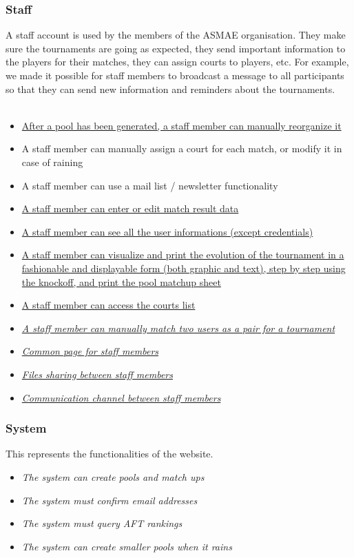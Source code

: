 \documentclass[a4paper, 12pt]{article}
\begin{document}
\subsubsection*{Staff} 
    A staff account is used by the members of the ASMAE organisation. They make sure the tournaments are going as expected, they send important information to the players for their matches, they can assign courts to players, etc. For example, we made it possible for staff members to  broadcast a message to all participants so that they can send new information and reminders about the tournaments.\\\\
    
    \begin{itemize}
    	\item \underline{After a pool has been generated, a staff member can manually reorganize it}
		\item A staff member can manually assign a court for each match, or modify it in case of raining
		\item A staff member can use a mail list / newsletter functionality
		\item \underline{A staff member can enter or edit match result data}
		\item \underline{A staff member can see all the user informations (except credentials)}
		\item \underline{A staff member can visualize and print the evolution of the tournament in a fashionable and displayable form (both graphic and text), step by step using the knockoff, and print the pool matchup sheet}
		\item \underline{A staff member can access the courts list}
		\item \underline{\textit{A staff member can manually match two users as a pair for a tournament}}
		\item \underline{\textit{Common page for staff members}}
		\item \underline{\textit{Files sharing between staff members}}
		\item \underline{\textit{Communication channel between staff members}}
    \end{itemize}
    
\subsubsection*{System}   
     This represents the functionalities of the website.
    \begin{itemize}
    	\item \textit{The system can create pools and match ups}
		\item \textit{The system must confirm email addresses}
		\item \textit{The system must query AFT rankings}
		\item \textit{The system can create smaller pools when it rains}
    \end{itemize}
    
\end{document}
